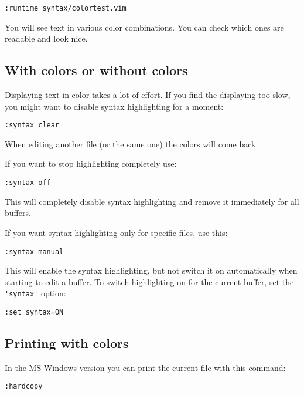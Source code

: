  \begin{Verbatim}[samepage=true]
 :runtime syntax/colortest.vim
 \end{Verbatim}

You will see text in various color combinations.
You can check which ones are readable and look nice.

\subsection{With colors or without colors}

Displaying text in color takes a lot of effort.
If you find the displaying too slow, you might want to disable syntax highlighting for a moment:

\begin{Verbatim}[samepage=true]
 :syntax clear
\end{Verbatim}

When editing another file (or the same one) the colors will come back.

\label{:syn-off}
If you want to stop highlighting completely use:

 \begin{Verbatim}[samepage=true]
 :syntax off
 \end{Verbatim}

This will completely disable syntax highlighting and remove it immediately for all buffers.

\label{:syn-manual}
If you want syntax highlighting only for specific files, use this:

 \begin{Verbatim}[samepage=true]
 :syntax manual
 \end{Verbatim}

This will enable the syntax highlighting, but not switch it on automatically when starting to edit a buffer.
To switch highlighting on for the current buffer, set the \verb!'syntax'! option:

 \begin{Verbatim}[samepage=true]
 :set syntax=ON
 \end{Verbatim}

\subsection{Printing with colors}
\label{syntax-printing}
In the MS-Windows version you can print the current file with this command:

 \begin{Verbatim}[samepage=true]
 :hardcopy
 \end{Verbatim}

